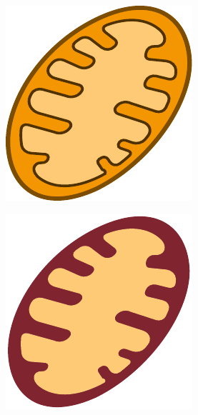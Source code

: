 \begin{figure}[h]
\begin{subfigure}[t]{0.2\linewidth}
        \includegraphics[width=\textwidth]{chapters/images/mitochondria-yellow}
    \end{subfigure}
    \begin{subfigure}[t]{0.2\linewidth}
        \includegraphics[width=\textwidth]{chapters/images/mitochondria-no-lines}

\end{subfigure}
\end{figure}
